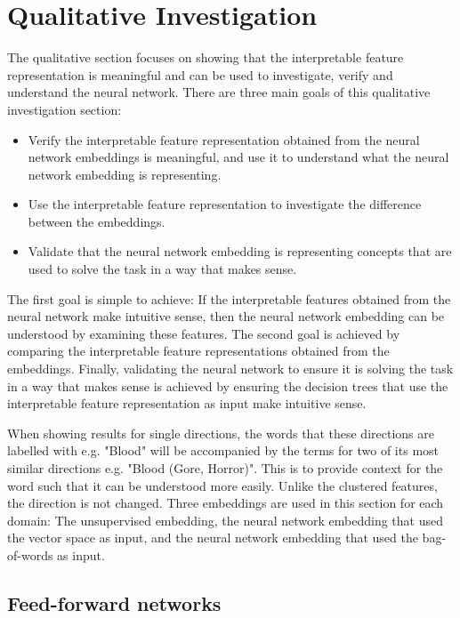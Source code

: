 \section{Qualitative Investigation}\label{ch5:qual}

The qualitative section  focuses on showing that the interpretable feature representation is meaningful and can be used to investigate, verify and understand the neural network. There are three main goals of this qualitative investigation section:

\begin{itemize}
	\item Verify the interpretable feature representation obtained from the neural network embeddings is meaningful, and use it to  understand what the neural network embedding is representing.
	\item Use the interpretable feature representation to investigate the difference between the embeddings.
	\item Validate that the neural network embedding is representing concepts that are used to solve the task in a way that makes sense.
\end{itemize}

The first goal is simple to achieve: If the interpretable features obtained from the neural network make intuitive sense, then the neural network embedding can be understood by examining these features. The second goal is achieved by comparing the interpretable feature representations obtained from the embeddings. Finally, validating the neural network to ensure it is solving the task in a way that makes sense is achieved by ensuring the decision trees that use the interpretable feature representation as input make intuitive sense. 

When showing results for single directions, the words that these directions are labelled with e.g. "Blood" will be accompanied by the terms for two of its most similar directions e.g. "Blood (Gore, Horror)". This is to provide context for the word such that it can be understood more easily. Unlike the clustered features, the direction is not changed. Three embeddings are used in this section for each domain: The unsupervised embedding, the neural network embedding that used the vector space as input, and the neural network embedding that used the bag-of-words as input. 

\subsection{Feed-forward networks}

